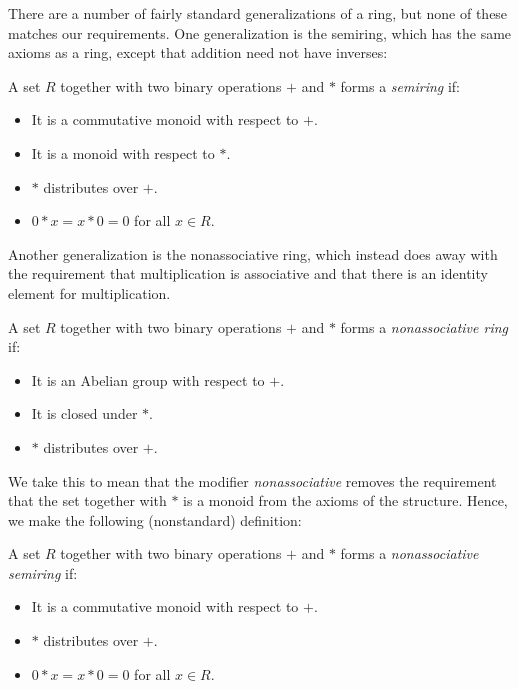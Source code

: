 There are a number of fairly standard generalizations of a ring, but none of these matches our requirements. One generalization is the semiring, which has the same axioms as a ring, except that addition need not have inverses:
\begin{Definition}
A set $R$ together with two binary operations $+$ and $*$ forms a \emph{semiring} if:
\begin{itemize}
\item It is a commutative monoid with respect to $+$.
\item It is a monoid with respect to $*$.
\item $*$ distributes over $+$.
\item $0 * x = x * 0 = 0$ for all $x \in R$.
\end{itemize}
\end{Definition}
Another generalization is the nonassociative ring, which instead does away with the requirement that multiplication is associative and that there is an identity element for multiplication.
\begin{Definition}
A set $R$ together with two binary operations $+$ and $*$ forms a \emph{non\-associative ring} if:
\begin{itemize}
\item It is an Abelian group with respect to $+$.
\item It is closed under $*$.
\item $*$ distributes over $+$.
\end{itemize}
\end{Definition}
We take this to mean that the modifier \emph{nonassociative} removes the requirement that the set together with $*$ is a monoid from the axioms of the structure. Hence, we make the following (nonstandard) definition:
\begin{Definition}\label{Def:NonassocSemiring}
A set $R$ together with two binary operations $+$ and $*$ forms a \emph{non\-associative semiring} if:
\begin{itemize}
\item It is a commutative monoid with respect to $+$.
\item $*$ distributes over $+$.
\item $0 * x = x * 0 = 0$ for all $x \in R$.
\end{itemize}
\end{Definition}


